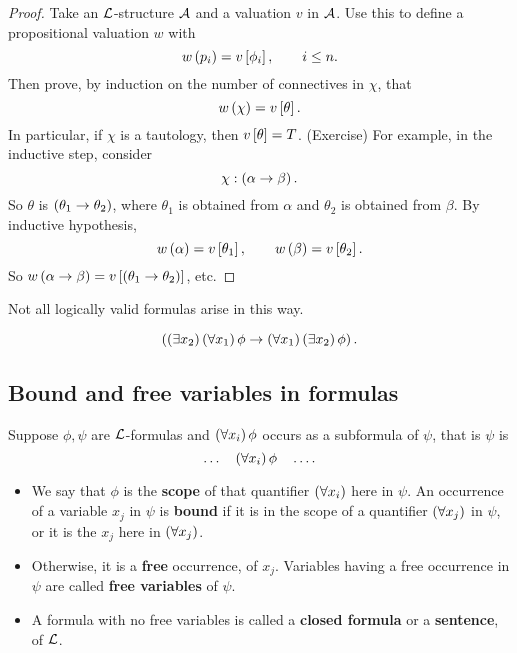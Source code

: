 
\begin{proof}
Take an $ \LL $-structure $ \AA $ and a valuation $ v $ in $ \AA $. Use this to define a propositional valuation $ w $ with
$$ w\rb{p_i} = v\sb{\phi_i}, \qquad i \le n. $$
Then prove, by induction on the number of connectives in $ \chi $, that
$$ w\rb{\chi} = v\sb{\theta}. $$
In particular, if $ \chi $ is a tautology, then $ v\sb{\theta} = T $. (Exercise) For example, in the inductive step, consider
$$ \chi : \impb{\alpha}{\beta}. $$
So $ \theta $ is $ \impb{\theta_1}{\theta_2} $, where $ \theta_1 $ is obtained from $ \alpha $ and $ \theta_2 $ is obtained from $ \beta $. By inductive hypothesis,
$$ w\rb{\alpha} = v\sb{\theta_1}, \qquad w\rb{\beta} = v\sb{\theta_2}. $$
So $ w\impb{\alpha}{\beta} = v\sb{\impb{\theta_1}{\theta_2}} $, etc.
\end{proof}

\begin{note*}
Not all logically valid formulas arise in this way.
\end{note*}

\begin{example*}
$$ \impb{\teb{x_2}\fab{x_1}\phi}{\fab{x_1}\teb{x_2}\phi}. $$
\end{example*}

\pagebreak

\subsection{Bound and free variables in formulas}

\begin{definition}
Suppose $ \phi, \psi $ are $ \LL $-formulas and $ \fab{x_i}\phi $ occurs as a subformula of $ \psi $, that is $ \psi $ is
$$ \dots \quad \fab{x_i}\phi \quad \dots. $$
\begin{itemize}
\item We say that $ \phi $ is the \textbf{scope} of that quantifier $ \fab{x_i} $ here in $ \psi $. An occurrence of a variable $ x_j $ in $ \psi $ is \textbf{bound} if it is in the scope of a quantifier $ \fab{x_j} $ in $ \psi $, or it is the $ x_j $ here in $ \fab{x_j} $.
\item Otherwise, it is a \textbf{free} occurrence, of $ x_j $. Variables having a free occurrence in $ \psi $ are called \textbf{free variables} of $ \psi $.
\item A formula with no free variables is called a \textbf{closed formula} or a \textbf{sentence}, of $ \LL $.
\end{itemize}
\end{definition}


